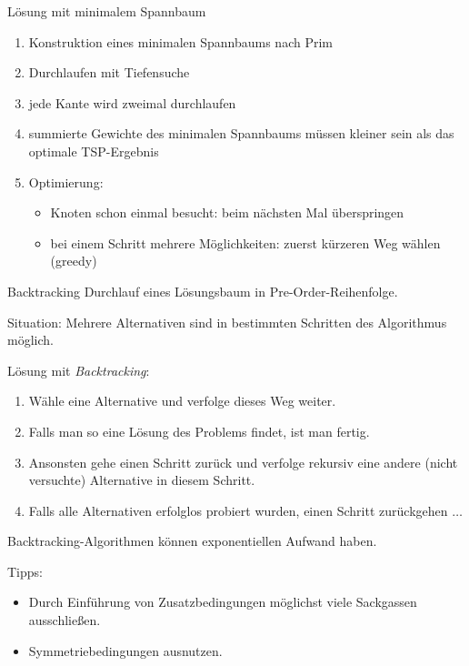 \begin{bonus}{Lösung mit minimalem Spannbaum}
    \begin{enumerate}
        \item Konstruktion eines minimalen Spannbaums nach Prim
        \item Durchlaufen mit Tiefensuche
        \item jede Kante wird zweimal durchlaufen
        \item summierte Gewichte des minimalen Spannbaums müssen kleiner sein als das optimale TSP-Ergebnis
        \item Optimierung:
              \begin{itemize}
                  \item Knoten schon einmal besucht: beim nächsten Mal überspringen
                  \item bei einem Schritt mehrere Möglichkeiten: zuerst kürzeren Weg wählen (greedy)
              \end{itemize}
    \end{enumerate}
\end{bonus}

\begin{defi}{Backtracking}
    Durchlauf eines Lösungsbaum in Pre-Order-Reihenfolge.

    Situation: Mehrere Alternativen sind in bestimmten Schritten des Algorithmus möglich.

    Lösung mit \emph{Backtracking}:
    \begin{enumerate}
        \item Wähle eine Alternative und verfolge dieses Weg weiter.
        \item Falls man so eine Lösung des Problems findet, ist man fertig.
        \item Ansonsten gehe einen Schritt zurück und verfolge rekursiv eine andere (nicht versuchte) Alternative in diesem Schritt.
        \item Falls alle Alternativen erfolglos probiert wurden, einen Schritt zurückgehen $\ldots$
    \end{enumerate}

    Backtracking-Algorithmen können exponentiellen Aufwand haben.

    Tipps:
    \begin{itemize}
        \item Durch Einführung von Zusatzbedingungen möglichst viele Sackgassen ausschließen.
        \item Symmetriebedingungen ausnutzen.
    \end{itemize}
\end{defi}

